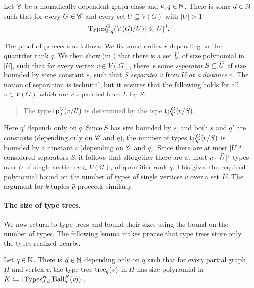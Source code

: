 \begin{theorem}\label{thm:ov-type-bound}
  Let $\mathscr C$ be a monadically dependent graph class and $k,q\in\mathbb N$. There is some $d\in\mathbb N$ such that for every $G\in\mathscr C$ and every set $U\subseteq V(G)$ with $|U|>1$,
  $$|\operatorname{Types}^G_{k,q}(V(G)/U)|\leqslant |U|^d.$$
\end{theorem}

The proof of  proceeds as follows. We fix some radius $r$ depending on the quantifier rank $q$.
We then show (in )  that there is a set $\widehat U$ of size polynomial in $|U|$, 
such that for every vertex $v\in V(G)$,
there is some  \emph{separator} $S\subseteq \widehat U$ of size bounded by some constant $s$,
such that $S$ \emph{separates} $v$ from $U$ \emph{at a distance} $r$.
The notion of separation is technical, 
but it ensures that the following holds
for all $v\in V(G)$ which are $r$-separated from $U$ by $S$:
\begin{quote}\centering
The type $\textnormal{tp}^G_q(v/U)$ is determined by the type $\textnormal{tp}^G_{q'}(v/S)$.
\end{quote}
Here $q'$ depends only on $q$.
Since $S$ has size bounded by $s$, and both $s$ and $q'$ are constants (depending only on $\mathscr C$ and $q$),
the number of types $\textnormal{tp}^G_{q'}(v/S)$ is bounded by a constant $c$ (depending on $\mathscr C$ and $q$). Since there are at most $|\widehat U|^s$ considered separators $S$, it follows that altogether there are at most $c\cdot |\widehat U|^s$  types over $U$ of single vertices $v\in V(G)$, of quantifier rank $q$. This gives the required polynomial bound on the number of types of single vertices $v$ over a set~$U$. The argument for $k$-tuples $\bar v$ proceeds similarly.

\paragraph{The size of type trees.}
We now return to type trees and bound their sizes using the bound on the number of types.
The following lemma makes precise that type trees store only the types realized nearby.

\begin{lemma}\label{lem:ov-tree-size}
  Let $q\in\mathbb N$. There is $d\in\mathbb N$ depending only on $q$ such that for every partial graph $H$ and vertex $v$,
  the type tree $\mathrm{tree}_q(v)$ in $H$ has size polynomial in $K\coloneqq|\operatorname{Types}^H_{d,d}(\operatorname{Ball}^H_d(v))|$.
\end{lemma}

